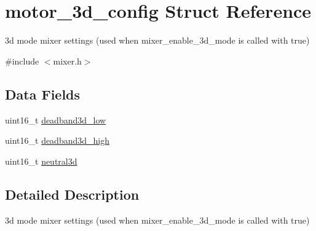 \hypertarget{structmotor__3d__config}{\section{motor\+\_\+3d\+\_\+config Struct Reference}
\label{structmotor__3d__config}
}


3d mode mixer settings (used when mixer\+\_\+enable\+\_\+3d\+\_\+mode is called with true)  




{\ttfamily \#include $<$mixer.\+h$>$}

\subsection*{Data Fields}
\begin{DoxyCompactItemize}
\item 
uint16\+\_\+t \hyperlink{structmotor__3d__config_aad1d5c14b6d3915090315f805d821659}{deadband3d\+\_\+low}
\item 
uint16\+\_\+t \hyperlink{structmotor__3d__config_a3b3a409292afe24809921d88f5711d3e}{deadband3d\+\_\+high}
\item 
uint16\+\_\+t \hyperlink{structmotor__3d__config_a50d884c84e2a5436c81530bcaf51c937}{neutral3d}
\end{DoxyCompactItemize}


\subsection{Detailed Description}
3d mode mixer settings (used when mixer\+\_\+enable\+\_\+3d\+\_\+mode is called with true) 

